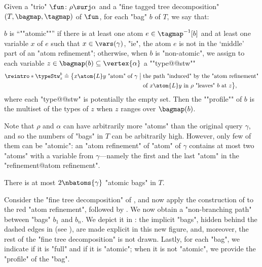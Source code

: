 \begin{definition}
    \AP Given a "trio" $\fun\colon \rho \surj \alpha$ and a "fine tagged tree decomposition"
    $(T, \bagmap, \tagmap)$ of $\fun$, for each "bag" $b$ of $T$, we say that:
    \begin{itemize}
        \itemAP $b$ is ``""atomic""'' if there is at least one atom $e \in \tagmap^{-1}[b]$ 
            and at least one variable $x$ of $e$ such that $x \in \vars(\gamma)$, "ie", the atom $e$ is not in the `middle' part of an "atom refinement";
        \itemAP otherwise, when $b$ is "non-atomic", we assign to each variable
            $z \in \bagmap(b) \subseteq \vertex{\alpha}$ a ""type@@stw""
            \begin{align*}
                \reintro*\typeStw_z^b \defeq
                \bigl\{ x \atom{L} y \text{ "atom" of $\gamma$} \;\big\vert\; {} &
                    \text{the path "induced" by the "atom refinement"} \\
                    &\text{of $x \atom{L} y$ in $\rho$ "leaves" $b$ at $z$}
                \bigr\},
            \end{align*}
			where each "type@@stw" is potentially the empty set.
            Then the ""profile"" of $b$ is the multiset of the types of $z$
            when $z$ ranges over $\bagmap(b)$.
    \end{itemize}
\end{definition}

Note that $\rho$ and $\alpha$ can have arbitrarily more "atoms" than the original query
$\gamma$, and so the numbers of "bags" in $T$ can be arbitrarily high. However,
only few of them can be "atomic": an "atom refinement" of "atom" of $\gamma$
contains at most two "atoms" with a variable from $\gamma$---namely the
first and the last "atom" in the "refinement@atom refinement".
\begin{fact}
	\AP\label{fact:bound-atomic-bags}
	There is at most $2 \nbatoms{\gamma}$ "atomic bags" in $T$.
\end{fact}


Consider the "fine tree decomposition" of , and now apply the construction of  to the red "atom refinement", followed by . We now obtain a "non-branching path"
between "bags" $b_1$ and $b_n$. We depict it in :
the implicit "bags", hidden behind the dashed edges in  (see ), are made explicit in this new figure, and, moreover, the rest of the "fine tree decomposition" is not drawn.
Lastly, for each "bag", we indicate if it is "full" and if it is "atomic"; when it is not "atomic", 
we provide the "profile" of the "bag".


